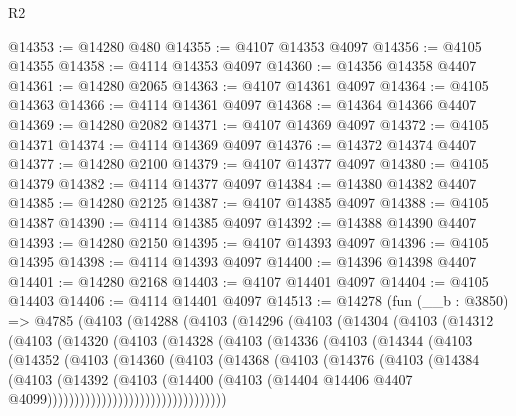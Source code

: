 \begin{lexlean}{R2}
\begin{coremodule}
@14353 := @14280 @480
@14355 := @4107 @14353 @4097
@14356 := @4105 @14355
@14358 := @4114 @14353 @4097
@14360 := @14356 @14358 @4407
@14361 := @14280 @2065
@14363 := @4107 @14361 @4097
@14364 := @4105 @14363
@14366 := @4114 @14361 @4097
@14368 := @14364 @14366 @4407
@14369 := @14280 @2082
@14371 := @4107 @14369 @4097
@14372 := @4105 @14371
@14374 := @4114 @14369 @4097
@14376 := @14372 @14374 @4407
@14377 := @14280 @2100
@14379 := @4107 @14377 @4097
@14380 := @4105 @14379
@14382 := @4114 @14377 @4097
@14384 := @14380 @14382 @4407
@14385 := @14280 @2125
@14387 := @4107 @14385 @4097
@14388 := @4105 @14387
@14390 := @4114 @14385 @4097
@14392 := @14388 @14390 @4407
@14393 := @14280 @2150
@14395 := @4107 @14393 @4097
@14396 := @4105 @14395
@14398 := @4114 @14393 @4097
@14400 := @14396 @14398 @4407
@14401 := @14280 @2168
@14403 := @4107 @14401 @4097
@14404 := @4105 @14403
@14406 := @4114 @14401 @4097
@14513 := @14278
    (fun (__b : @3850) =>
    @4785
      (@4103
        (@14288
          (@4103
            (@14296
              (@4103
                (@14304
                  (@4103
                    (@14312
                      (@4103
                        (@14320
                          (@4103
                            (@14328
                              (@4103
                                (@14336
                                  (@4103
                                    (@14344
                                      (@4103
                                        (@14352
                                          (@4103
                                            (@14360
                                              (@4103
                                                (@14368
                                                  (@4103
                                                    (@14376
                                                      (@4103
                                                        (@14384
                                                          (@4103
                                                            (@14392
                                                              (@4103
                                                                (@14400
                                                                  (@4103
                                                                    (@14404
                                                                      @14406
                                                                      @4407
                                                                      @4099)))))))))))))))))))))))))))))))))

\end{coremodule}
\end{lexlean}
